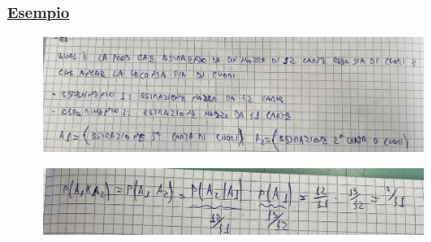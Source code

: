 \documentclass{article}
\begin{document}
\subsubsection{\underline{Esempio}}
\begin{figure}[ht]
\centering
\includegraphics[scale=0.11]{ese/6.jpeg}
\end{figure}
\begin{figure}[ht]
\centering
\includegraphics[scale=0.12]{ese/6a.jpeg}
\end{figure}
\end{document}
